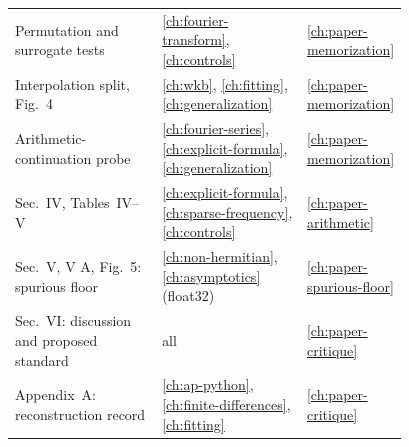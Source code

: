 \begin{center}
\begin{tabular}{p{0.40\linewidth}p{0.38\linewidth}l}
Permutation and surrogate tests & \ref{ch:fourier-transform}, \ref{ch:controls} & \ref{ch:paper-memorization}\\
Interpolation split, Fig.~4 & \ref{ch:wkb}, \ref{ch:fitting}, \ref{ch:generalization} & \ref{ch:paper-memorization}\\
Arithmetic-continuation probe & \ref{ch:fourier-series}, \ref{ch:explicit-formula}, \ref{ch:generalization} & \ref{ch:paper-memorization}\\
Sec.~IV, Tables~IV--V & \ref{ch:explicit-formula}, \ref{ch:sparse-frequency}, \ref{ch:controls} & \ref{ch:paper-arithmetic}\\
Sec.~V, V A, Fig.~5: spurious floor & \ref{ch:non-hermitian}, \ref{ch:asymptotics} (float32) & \ref{ch:paper-spurious-floor}\\
Sec.~VI: discussion and proposed standard & all & \ref{ch:paper-critique}\\
Appendix~A: reconstruction record & \ref{ch:ap-python}, \ref{ch:finite-differences}, \ref{ch:fitting} & \ref{ch:paper-critique}\\
\bottomrule
\end{tabular}
\end{center}
